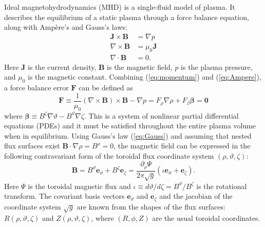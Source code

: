 \documentclass{article}
\newcommand{\ev}{{\mathbf e}_{\vartheta}}
\newcommand{\ez}{{\mathbf e}_{\zeta}}
\begin{document}
Ideal magnetohydrodynamics (MHD) is a single-fluid model of plasma.
It describes the equilibrium of a static plasma through a force balance equation, along with Amp\`ere's and Gauss's laws:
%
\begin{subequations}
  \label{eq:equil}
  \begin{align}
    \label{eq:momentum}
    \mathbf{J} \times \mathbf{B} &= \nabla p \\
    \label{eq:Ampere}
    \nabla \times \mathbf{B} &= \mu_0 \mathbf{J} \\
    \label{eq:Gauss}
    \nabla \cdot \mathbf{B} &= 0.
  \end{align}
\end{subequations}
%
Here $\mathbf{J}$ is the current density, $\mathbf{B}$ is the magnetic field, $p$ is the plasma pressure, and $\mu_0$ is the magnetic constant.
Combining (\ref{eq:momentum}) and (\ref{eq:Ampere}), a force balance error $\mathbf{F}$ can be defined as
%
\begin{equation}
  \label{eq:F}
  \mathbf{F} \equiv \frac{1}{\mu_0} \left( \nabla \times \mathbf{B} \right) \times \mathbf{B} - \nabla p = F_\rho \nabla\rho + F_\beta \mathbf{\beta} = \mathbf{0}
\end{equation}
%
where $\mathbf{\beta} \equiv B^\zeta \nabla \vartheta - B^\vartheta \nabla \zeta$.
This is a system of nonlinear partial differential equations (PDEs) and it must be satisfied throughout the entire plasma volume when in equilibrium.
Using Gauss's law (\ref{eq:Gauss}) and assuming that nested flux surfaces exist $\mathbf{B}\cdot\nabla\rho=B^\rho=0$, the magnetic field can be expressed in the following contravariant form of the toroidal flux coordinate system $(\rho,\vartheta,\zeta)$:
%
\begin{equation}
  \label{eq:B}
  \mathbf{B} = B^\vartheta \ev + B^\zeta \ez = \frac{\partial_\rho \Psi}{2\pi \sqrt{g}} \left( \iota \ev + \ez \right).
\end{equation}
%
Here $\Psi$ is the toroidal magnetic flux and $\iota\equiv d\vartheta/d\zeta = B^\vartheta/B^\zeta$ is the rotational transform.
The covariant basis vectors $\ev$ and $\ez$ and the jacobian of the coordinate system $\sqrt{g}$ are known from the shapes of the flux surfaces: $R(\rho,\vartheta,\zeta)$ and $Z(\rho,\vartheta,\zeta)$, where $(R,\phi,Z)$ are the usual toroidal coordinates.
\end{document}

